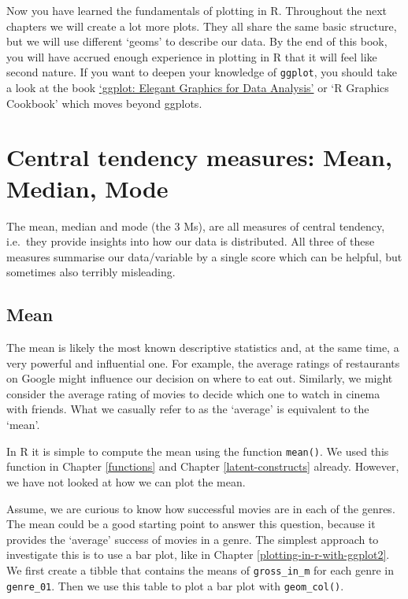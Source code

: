 \documentclass[
]{book}
\begin{document}
Now you have learned the fundamentals of plotting in R. Throughout the next chapters we will create a lot more plots. They all share the same basic structure, but we will use different `geoms' to describe our data. By the end of this book, you will have accrued enough experience in plotting in R that it will feel like second nature. If you want to deepen your knowledge of \texttt{ggplot}, you should take a look at the book \href{https://ggplot2-book.org}{`ggplot: Elegant Graphics for Data Analysis'} or `R Graphics Cookbook' which moves beyond ggplots.

\hypertarget{central-tendency}{%
\section{Central tendency measures: Mean, Median, Mode}\label{central-tendency}}

The mean, median and mode (the 3 Ms), are all measures of central tendency, i.e.~they provide insights into how our data is distributed. All three of these measures summarise our data/variable by a single score which can be helpful, but sometimes also terribly misleading.

\hypertarget{mean}{%
\subsection{Mean}\label{mean}}

The mean is likely the most known descriptive statistics and, at the same time, a very powerful and influential one. For example, the average ratings of restaurants on Google might influence our decision on where to eat out. Similarly, we might consider the average rating of movies to decide which one to watch in cinema with friends. What we casually refer to as the `average' is equivalent to the `mean'.

In R it is simple to compute the mean using the function \texttt{mean()}. We used this function in Chapter \ref{functions} and Chapter \ref{latent-constructs} already. However, we have not looked at how we can plot the mean.

Assume, we are curious to know how successful movies are in each of the genres. The mean could be a good starting point to answer this question, because it provides the `average' success of movies in a genre. The simplest approach to investigate this is to use a bar plot, like in Chapter \ref{plotting-in-r-with-ggplot2}. We first create a tibble that contains the means of \texttt{gross\_in\_m} for each genre in \texttt{genre\_01}. Then we use this table to plot a bar plot with \texttt{geom\_col()}.
\end{document}
